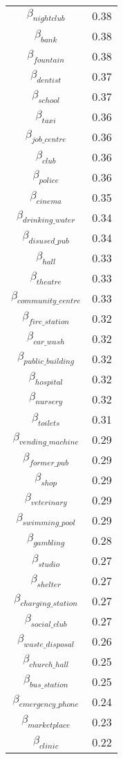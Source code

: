 \begin{tabular}{c|c}
$\beta_{nightclub}$ & 0.38 \\
$\beta_{bank}$ & 0.38 \\
$\beta_{fountain}$ & 0.38 \\
$\beta_{dentist}$ & 0.37 \\
$\beta_{school}$ & 0.37 \\
$\beta_{taxi}$ & 0.36 \\
$\beta_{job\_centre}$ & 0.36 \\
$\beta_{club}$ & 0.36 \\
$\beta_{police}$ & 0.36 \\
$\beta_{cinema}$ & 0.35 \\
$\beta_{drinking\_water}$ & 0.34 \\
$\beta_{disused\_pub}$ & 0.34 \\
$\beta_{hall}$ & 0.33 \\
$\beta_{theatre}$ & 0.33 \\
$\beta_{community\_centre}$ & 0.33 \\
$\beta_{fire\_station}$ & 0.32 \\
$\beta_{car\_wash}$ & 0.32 \\
$\beta_{public\_building}$ & 0.32 \\
$\beta_{hospital}$ & 0.32 \\
$\beta_{nursery}$ & 0.32 \\
$\beta_{toilets}$ & 0.31 \\
$\beta_{vending\_machine}$ & 0.29 \\
$\beta_{former\_pub}$ & 0.29 \\
$\beta_{shop}$ & 0.29 \\
$\beta_{veterinary}$ & 0.29 \\
$\beta_{swimming\_pool}$ & 0.29 \\
$\beta_{gambling}$ & 0.28 \\
$\beta_{studio}$ & 0.27 \\
$\beta_{shelter}$ & 0.27 \\
$\beta_{charging\_station}$ & 0.27 \\
$\beta_{social\_club}$ & 0.27 \\
$\beta_{waste\_disposal}$ & 0.26 \\
$\beta_{church\_hall}$ & 0.25 \\
$\beta_{bus\_station}$ & 0.25 \\
$\beta_{emergency\_phone}$ & 0.24 \\
$\beta_{marketplace}$ & 0.23 \\
$\beta_{clinic}$ & 0.22 \\

\end{tabular}
